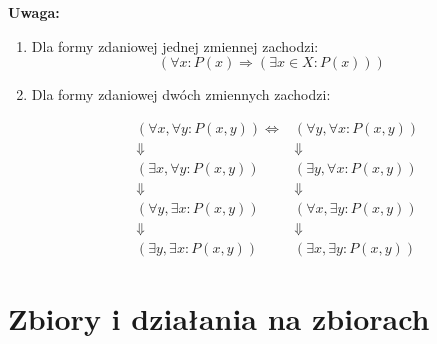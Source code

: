 \documentclass[a5paper,8pt]{article}
\begin{document}
            \pagebreak
            {\large{\textbf{Uwaga:}}}
            \begin{enumerate}
                \item Dla formy zdaniowej jednej zmiennej zachodzi:
                \begin{equation*}
                    (\forall x : P(x) \Rightarrow (\exists x \in X : P(x)))
                \end{equation*}

                \item Dla formy zdaniowej dwóch zmiennych zachodzi:

                \begin{equation*}
                    \begin{aligned}
                        &( \forall x, \forall y : P(x, y) ) \Longleftrightarrow&( \forall y, \forall x : P(x,y)) \\
                        & \Downarrow & \Downarrow \\
                        &( \exists x, \forall y : P(x, y) ) & ( \exists y, \forall x : P(x,y)) \\
                        & \Downarrow & \Downarrow \\
                        &( \forall y, \exists x : P(x, y) ) & ( \forall x, \exists y : P(x,y)) \\
                        & \Downarrow & \Downarrow \\
                        &( \exists y, \exists x : P(x, y) ) & ( \exists x, \exists y : P(x,y))
                    \end{aligned}
                \end{equation*}

            \end{enumerate}



    \section{Zbiory i działania na zbiorach} %
    \label{sec:zbiory_i_dzialania_na_zbiorach}
\end{document}
